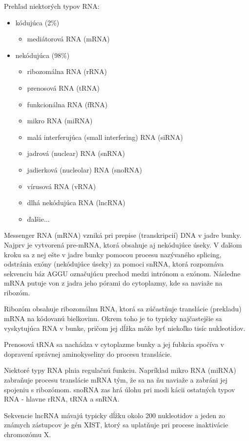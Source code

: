 \indent Prehľad niektorých typov RNA:
\begin{itemize}
\item kódujúca (2\%)
\begin{itemize}
\item mediátorová RNA (mRNA)
\end{itemize}
\item nekódujúca (98\%)
\begin{itemize}
\item ribozomálna RNA (rRNA)
\item prenosová RNA (tRNA)
\item funkcionálna RNA (fRNA)
\item mikro RNA (miRNA)
\item malá interferujúca (small interfering) RNA (siRNA)
\item jadrová (nuclear) RNA (snRNA)
\item jadierková (nucleolar) RNA (snoRNA)
\item vírusová RNA (vRNA)
\item dlhá nekódujúca RNA (lncRNA)
\item ďalšie...
\end{itemize}
\end{itemize}

\indent Messenger RNA (mRNA) vzniká pri prepise (transkripcií) DNA v jadre bunky. Najprv je vytvorená pre-mRNA, ktorá obsahuje aj nekódujúce úseky. V ďalšom kroku sa z nej ešte v jadre bunky pomocou procesu nazývaného splicing, odstránia exóny (nekódujúce úseky)  za pomoci snRNA, ktorá rozpoznáva sekvenciu báz AGGU označujúcu prechod medzi intrónom  a exónom. Následne mRNA putuje von z jadra jeho pórami do cytoplazmy, kde sa naviaže na ribozóm. \cite{Alberts02}


\indent Ribozóm obsahuje ribozomálnu RNA, ktorá sa zúčastňuje translácie  (prekladu) mRNA na kódovanú bielkovinu. Okrem toho je to typicky najčastejšie sa vyskytujúca RNA v bunke, pričom jej dĺžka môže byť niekoľko tisíc nukleotidov.


\indent Prenosová tRNA sa nachádza v cytoplazme bunky a jej fubkcia spočíva v dopravení správnej aminokyseliny do procesu translácie.


\indent  Niektoré typy RNA plnia regulačnú funkciu. Napríklad mikro RNA (miRNA)
zabraňuje procesu translácie mRNA tým, že sa na ňu naviaže a zabráni jej spojeniu s ribozómom. snoRNA zas hrá úlohu pri modikácii
ostatných typov RNA - hlavne rRNA, tRNA a snRNA.


\indent Sekvencie lncRNA mávajú typicky dĺžku okolo 200 nukleotidov a jeden zo známych zástupcov je gén XIST, ktorý sa
uplatňuje pri procese inaktivácie chromozómu X. \cite{Rinn a Chang, 2012}


